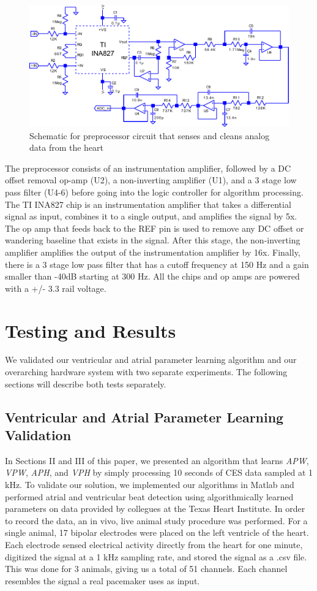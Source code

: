 \documentclass[conference]{IEEEtran}
\newcommand{\APW}{\textit{APW}}
\newcommand{\VPW}{\textit{VPW}}
\newcommand{\APH}{\textit{APH}}
\newcommand{\VPH}{\textit{VPH}}
\begin{document}
\begin{figure}[h]
	\centering
	\includegraphics[width=.9\columnwidth]{schematic.pdf}
	\caption{Schematic for preprocessor circuit that senses and cleans analog data from the heart}
	\label{fig:schematic}
\end{figure}

The preprocessor consists of an instrumentation
amplifier, followed by a DC offset removal op-amp (U2), a
non-inverting amplifier (U1), and a 3 stage low pass filter (U4-6)
before going into the logic controller for algorithm
processing. The TI INA827 chip is an instrumentation
amplifier that takes a differential signal as input,
combines it to a single output, and amplifies the signal
by 5x. The op amp that feeds back to the REF pin is used to
remove any DC offset or wandering baseline that exists
in the signal. After this stage, the non-inverting amplifier
amplifies the output of the instrumentation amplifier by
16x. Finally, there is a 3 stage low pass filter that has a
cutoff frequency at 150 Hz and a gain smaller than -40dB 
starting at 300 Hz. All the chips and op amps are
powered with a +/- 3.3 rail voltage.

\section{Testing and Results}
We validated our ventricular and atrial parameter
learning algorithm and our overarching hardware system
with two separate experiments. The following sections
will describe both tests separately.

\subsection{Ventricular and Atrial Parameter Learning Validation}
In Sections II and III of this paper, we presented an
algorithm that learns \APW{}, \VPW{}, \APH{}, and \VPH{} by
simply processing 10 seconds of CES data sampled at 1
kHz. To validate our solution, we implemented our algorithms in
Matlab and performed atrial and ventricular beat
detection using algorithmically learned parameters on
data provided by collegues at the Texas Heart Institute.
In order to record the data, an in vivo,
live animal study procedure was performed. For a single
animal, 17 bipolar electrodes were placed on the left ventricle
of the heart. Each electrode sensed electrical activity
directly from the heart for one minute, digitized the
signal at a 1 kHz sampling rate, and stored the signal as
a .csv file. This was done for 3 animals, giving us a total
of 51 channels.
Each channel resembles the signal a real pacemaker uses as input.
\end{document}
